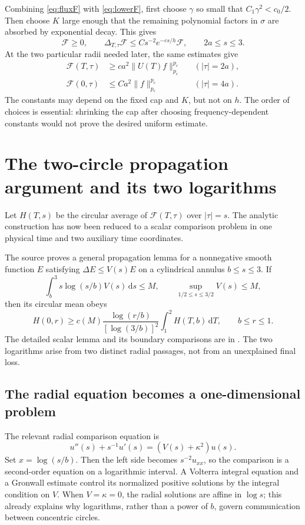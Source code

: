 \documentclass[11pt,a4paper]{article}
\numberwithin{equation}{section}
\theoremstyle{definition}
\theoremstyle{remark}
\newcommand{\dd}{\,\mathrm d}
\newcommand{\pc}{p_{\mathrm c}}
\begin{document}
Combining \eqref{eq:fluxF} with \eqref{eq:lowerF}, first choose $\gamma$ so small
that $C_1\gamma^2<c_0/2$. Then choose $K$ large enough that the remaining
polynomial factors in $\sigma$ are absorbed by exponential decay. This gives
\begin{equation}\label{eq:scalarinequality}
 \mathcal F\ge0,\qquad
 \Delta_{T,\tau}\mathcal F
 \le C s^{-2}e^{-cs/h}\mathcal F,
 \qquad 2a\le s\le3.
\end{equation}
At the two particular radii needed later, the same estimates give
\begin{align}
 \mathcal F(T,\tau)&\ge c a^2\|U(T)f\|_{\pc}^{\pc}
                         &&(|\tau|=2a),\label{eq:innerobserve}\\
 \mathcal F(0,\tau)&\le C a^2\|f\|_{\pc}^{\pc}
                         &&(|\tau|=4a).\label{eq:outerinitial}
\end{align}
The constants may depend on the fixed cap and $K$, but not on $h$. The order
of choices is essential: shrinking the cap after choosing frequency-dependent
constants would not prove the desired uniform estimate.

\section{The two-circle propagation argument and its two logarithms}
\label{sec:propagate}
Let $H(T,s)$ be the circular average of $\mathcal F(T,\tau)$ over $|\tau|=s$.
The analytic construction has now been reduced to a scalar comparison problem
in one physical time and two auxiliary time coordinates.

The source proves a general propagation lemma for a nonnegative smooth
function $E$ satisfying $\Delta E\le V(s)E$ on a cylindrical annulus
$b\le s\le3$. If
\[
 \int_b^3 s\log(s/b)V(s)\dd s\le M,
 \qquad \sup_{1/2\le s\le3/2}V(s)\le M,
\]
then its circular mean obeys
\begin{equation}\label{eq:propagation}
 H(0,r)\ge c(M)
 \frac{\log(r/b)}{[\log(3/b)]^2}
             \int_1^2 H(T,b)\dd T,
 \qquad b\le r\le1.
\end{equation}
The detailed scalar lemma and its boundary comparisons are in
\cite{propagation}. The two logarithms arise from two distinct radial passages,
not from an unexplained final loss.

\subsection{The radial equation becomes a one-dimensional problem}
The relevant radial comparison equation is
\[
 u''(s)+s^{-1}u'(s)=(V(s)+\kappa^2)u(s).
\]
Set $x=\log(s/b)$. Then the left side becomes $s^{-2}u_{xx}$, so the
comparison is a second-order equation on a logarithmic interval. A Volterra
integral equation and a Gronwall estimate control its normalized positive
solutions by the integral condition on $V$. When $V=\kappa=0$, the radial
solutions are affine in $\log s$; this already explains why logarithms, rather
than a power of $b$, govern communication between concentric circles.
\end{document}
